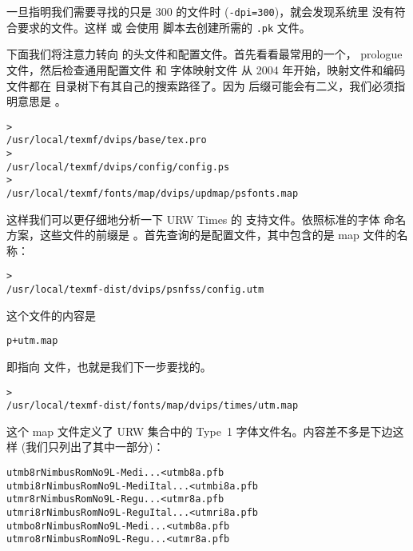 \documentclass{article}
\begin{document}
一旦指明我们需要寻找的只是 300\dpi{} 的文件时 (\texttt{-dpi=300})，就会发现系统里
没有符合要求的文件。这样  或  会使用 
脚本去创建所需的 \texttt{.pk} 文件。

下面我们将注意力转向  的头文件和配置文件。首先看看最常用的一个，
prologue 文件，然后检查通用配置文件  和 \PS{} 字体映射文件
\Dash 从 2004 年开始，映射文件和编码文件都在 
目录树下有其自己的搜索路径了。因为  后缀可能会有二义，我们必须指明意思是
。

\begin{alltt}
  > 
  /usr/local/texmf/dvips/base/tex.pro
  > 
  /usr/local/texmf/dvips/config/config.ps
  > 
  /usr/local/texmf/fonts/map/dvips/updmap/psfonts.map
\end{alltt}

这样我们可以更仔细地分析一下 URW Times 的 \PS{} 支持文件。依照标准的字体
命名方案，这些文件的前缀是 。首先查询的是配置文件，其中包含的是 map
文件的名称：

\begin{alltt}
  > 
  /usr/local/texmf-dist/dvips/psnfss/config.utm
\end{alltt}

这个文件的内容是

\begin{alltt}
  p +utm.map
\end{alltt}

即指向  文件，也就是我们下一步要找的。

\begin{alltt}
  > 
  /usr/local/texmf-dist/fonts/map/dvips/times/utm.map
\end{alltt}

这个 map 文件定义了 URW 集合中的 Type~1 \PS{} 字体文件名。内容差不多是下边这样
(我们只列出了其中一部分)：

\begin{alltt}
  utmb8r  NimbusRomNo9L-Medi    ... <utmb8a.pfb
  utmbi8r NimbusRomNo9L-MediItal... <utmbi8a.pfb
  utmr8r  NimbusRomNo9L-Regu    ... <utmr8a.pfb
  utmri8r NimbusRomNo9L-ReguItal... <utmri8a.pfb
  utmbo8r NimbusRomNo9L-Medi    ... <utmb8a.pfb
  utmro8r NimbusRomNo9L-Regu    ... <utmr8a.pfb
\end{alltt}
\end{document}
